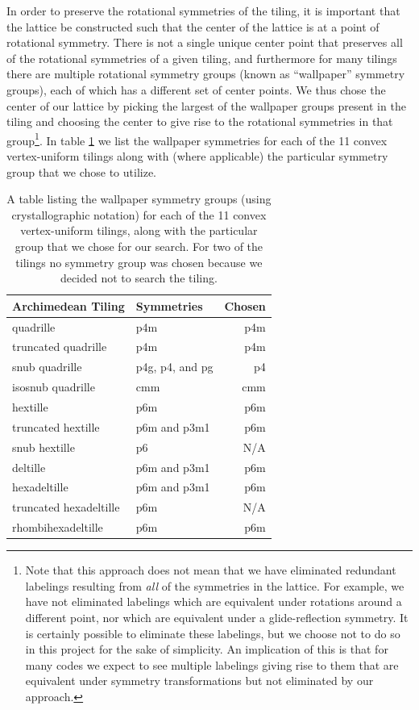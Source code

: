 \documentclass[12pt]{amsbook}
\theoremstyle{plain}
\theoremstyle{definition}
\theoremstyle{remark}
\begin{document}
In order to preserve the rotational symmetries of the tiling, it is important that the lattice be constructed such that the center of the lattice is at a point of rotational symmetry.  There is not a single unique center point that preserves all of the rotational symmetries of a given tiling, and furthermore for many tilings there are multiple rotational symmetry groups (known as ``wallpaper'' symmetry groups), each of which has a different set of center points.  We thus chose the center of our lattice by picking the largest of the wallpaper groups present in the tiling and choosing the center to give rise to the rotational symmetries in that group\footnote{Note that this approach does not mean that we have eliminated redundant labelings resulting from \emph{all} of the symmetries in the lattice.  For example, we have not eliminated labelings which are equivalent under rotations around a different point, nor which are equivalent under a glide-reflection symmetry.  It is certainly possible to eliminate these labelings, but we choose not to do so in this project for the sake of simplicity.  An implication of this is that for many codes we expect to see multiple labelings giving rise to them that are equivalent under symmetry transformations but not eliminated by our approach.}.  In table \ref{table:symmetries} we list the wallpaper symmetries for each of the 11 convex vertex-uniform tilings along with (where applicable) the particular symmetry group that we chose to utilize.

\begin{table}
\begin{tabular}{llr} \toprule
Archimedean Tiling & Symmetries & Chosen\\ \midrule
quadrille & p4m & p4m \\
truncated quadrille & p4m & p4m \\
snub quadrille & p4g, p4, and pg & p4 \\
isosnub quadrille & cmm & cmm \\
hextille & p6m & p6m \\
truncated hextille & p6m and p3m1 & p6m \\
snub hextille & p6 & N/A \\
deltille & p6m and p3m1 & p6m \\
hexadeltille & p6m and p3m1 & p6m \\
truncated hexadeltille & p6m & N/A \\
rhombihexadeltille & p6m & p6m \\
\bottomrule
\end{tabular}
\caption[Symmetry groups of the tilings]{
\label{table:symmetries}
A table listing the wallpaper symmetry groups (using crystallographic notation) for each of the 11 convex vertex-uniform tilings, along with the particular group that we chose for our search.  For two of the tilings no symmetry group was chosen because we decided not to search the tiling.
}
\end{table}
\end{document}
